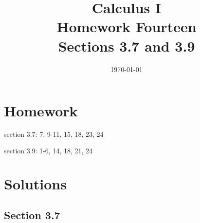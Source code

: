 \documentclass[letterpaper, landscape]{exam}
\title{Calculus I \\ Homework Fourteen \\ Sections 3.7 and 3.9}
\author{}
\date{\today}
\begin{document}
  \maketitle

  \section{Homework}
    \begin{itemize*}
      \item section 3.7: 7, 9-11, 15, 18, 23, 24 
      \item section 3.9: 1-6, 14, 18, 21, 24
    \end{itemize*}

  \ifprintanswers

  \section{Solutions}

  \subsection{Section 3.7}
\end{document}
